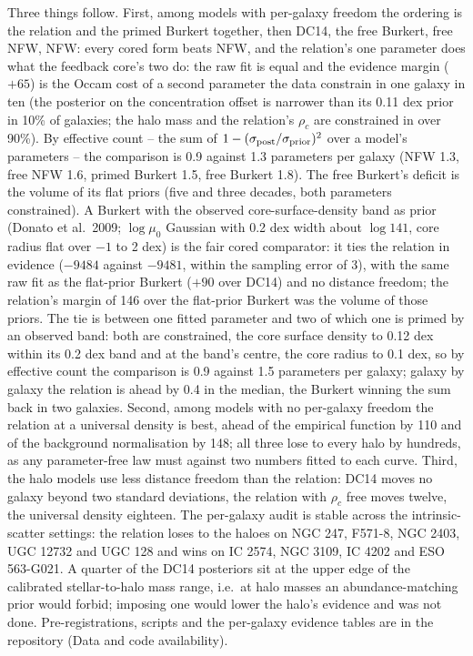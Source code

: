 \documentclass[
  10pt,
]{article}
\begin{document}
Three things follow. First, among models with per-galaxy freedom the ordering is the relation and the primed Burkert together, then DC14, the free Burkert, free NFW, NFW: every cored form beats NFW, and the relation's one parameter does what the feedback core's two do: the raw fit is equal and the evidence margin ($+65$) is the Occam cost of a second parameter the data constrain in one galaxy in ten (the posterior on the concentration offset is narrower than its 0.11 dex prior in 10\% of galaxies; the halo mass and the relation's $\rho_c$ are constrained in over 90\%). By effective count -- the sum of $1-(\sigma_{\rm post}/\sigma_{\rm prior})^2$ over a model's parameters -- the comparison is 0.9 against 1.3 parameters per galaxy (NFW 1.3, free NFW 1.6, primed Burkert 1.5, free Burkert 1.8). The free Burkert's deficit is the volume of its flat priors (five and three decades, both parameters constrained). A Burkert with the observed core-surface-density band as prior (Donato et al.~2009; $\log\mu_0$ Gaussian with 0.2 dex width about $\log 141$, core radius flat over $-1$ to 2 dex) is the fair cored comparator: it ties the relation in evidence ($-9484$ against $-9481$, within the sampling error of 3), with the same raw fit as the flat-prior Burkert ($+90$ over DC14) and no distance freedom; the relation's margin of 146 over the flat-prior Burkert was the volume of those priors. The tie is between one fitted parameter and two of which one is primed by an observed band: both are constrained, the core surface density to 0.12 dex within its 0.2 dex band and at the band's centre, the core radius to 0.1 dex, so by effective count the comparison is 0.9 against 1.5 parameters per galaxy; galaxy by galaxy the relation is ahead by 0.4 in the median, the Burkert winning the sum back in two galaxies. Second, among models with no per-galaxy freedom the relation at a universal density is best, ahead of the empirical function by 110 and of the background normalisation by 148; all three lose to every halo by hundreds, as any parameter-free law must against two numbers fitted to each curve. Third, the halo models use less distance freedom than the relation: DC14 moves no galaxy beyond two standard deviations, the relation with $\rho_c$ free moves twelve, the universal density eighteen. The per-galaxy audit is stable across the intrinsic-scatter settings: the relation loses to the haloes on NGC 247, F571-8, NGC 2403, UGC 12732 and UGC 128 and wins on IC 2574, NGC 3109, IC 4202 and ESO 563-G021. A quarter of the DC14 posteriors sit at the upper edge of the calibrated stellar-to-halo mass range, i.e.\ at halo masses an abundance-matching prior would forbid; imposing one would lower the halo's evidence and was not done. Pre-registrations, scripts and the per-galaxy evidence tables are in the repository (Data and code availability).
\end{document}
